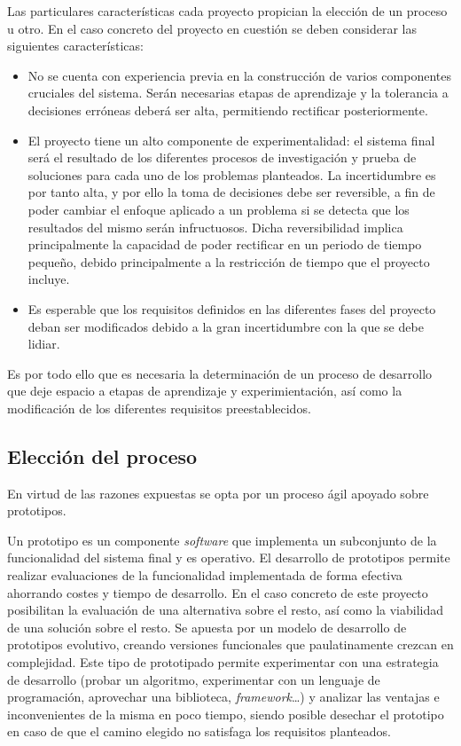 Las particulares características cada proyecto propician la elección de un proceso u otro. En el caso concreto del proyecto en cuestión se deben considerar las siguientes características:

\begin{itemize}

\item No se cuenta con experiencia previa en la construcción de varios componentes cruciales del sistema. Serán necesarias etapas de aprendizaje y la tolerancia a decisiones erróneas deberá ser alta, permitiendo rectificar posteriormente.

\item El proyecto tiene un alto componente de experimentalidad: el sistema final será el resultado de los diferentes procesos de investigación y prueba de soluciones para cada uno de los problemas planteados. La incertidumbre es por tanto alta, y por ello la toma de decisiones debe ser reversible, a fin de poder cambiar el enfoque aplicado a un problema si se detecta que los resultados del mismo serán infructuosos. Dicha reversibilidad implica principalmente la capacidad de poder rectificar en un periodo de tiempo pequeño, debido principalmente a la restricción de tiempo que el proyecto incluye.

\item Es esperable que los requisitos definidos en las diferentes fases del proyecto deban ser modificados debido a la gran incertidumbre con la que se debe lidiar.

\end{itemize}

Es por todo ello que es necesaria la determinación de un proceso de desarrollo que deje espacio a etapas de aprendizaje y experimientación, así como la modificación de los diferentes requisitos preestablecidos. 

\subsection{Elección del proceso}
\label{process}
En virtud de las razones expuestas se opta por un proceso ágil apoyado sobre prototipos. 

Un prototipo es un componente \textit{software} que implementa un subconjunto de la funcionalidad del sistema final y es operativo. El desarrollo de prototipos permite realizar evaluaciones de la funcionalidad implementada de forma efectiva ahorrando costes y tiempo de desarrollo. En el caso concreto de este proyecto posibilitan la evaluación de una alternativa sobre el resto, así como la viabilidad de una solución sobre el resto. Se apuesta por un modelo de desarrollo de prototipos evolutivo\cite{10.1109/TSE.1975.6312870}, creando versiones funcionales que paulatinamente crezcan en complejidad. Este tipo de prototipado permite experimentar con una estrategia de desarrollo (probar un algoritmo, experimentar con un lenguaje de programación, aprovechar una biblioteca, \textit{framework}\dots) y analizar las ventajas e inconvenientes de la misma en poco tiempo, siendo posible desechar el prototipo en caso de que el camino elegido no satisfaga los requisitos planteados.

